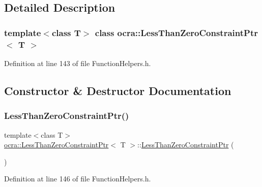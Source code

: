 \subsection{Detailed Description}
\subsubsection*{template$<$class T$>$\newline
class ocra\+::\+Less\+Than\+Zero\+Constraint\+Ptr$<$ T $>$}



Definition at line 143 of file Function\+Helpers.\+h.



\subsection{Constructor \& Destructor Documentation}
\hypertarget{classocra_1_1LessThanZeroConstraintPtr_af07ff846216e63b3fb91f91e46d429b8}{}\label{classocra_1_1LessThanZeroConstraintPtr_af07ff846216e63b3fb91f91e46d429b8} 
\subsubsection{\texorpdfstring{Less\+Than\+Zero\+Constraint\+Ptr()}{LessThanZeroConstraintPtr()}\hspace{0.1cm}{\footnotesize\ttfamily [1/2]}}
{\footnotesize\ttfamily template$<$class T$>$ \\
\hyperlink{classocra_1_1LessThanZeroConstraintPtr}{ocra\+::\+Less\+Than\+Zero\+Constraint\+Ptr}$<$ T $>$\+::\hyperlink{classocra_1_1LessThanZeroConstraintPtr}{Less\+Than\+Zero\+Constraint\+Ptr} (\begin{DoxyParamCaption}{ }\end{DoxyParamCaption})\hspace{0.3cm}{\ttfamily [inline]}}



Definition at line 146 of file Function\+Helpers.\+h.

\hypertarget{classocra_1_1LessThanZeroConstraintPtr_aa8e28fec379f5aa5ee146543fecc8e9a}{}\label{classocra_1_1LessThanZeroConstraintPtr_aa8e28fec379f5aa5ee146543fecc8e9a} 
